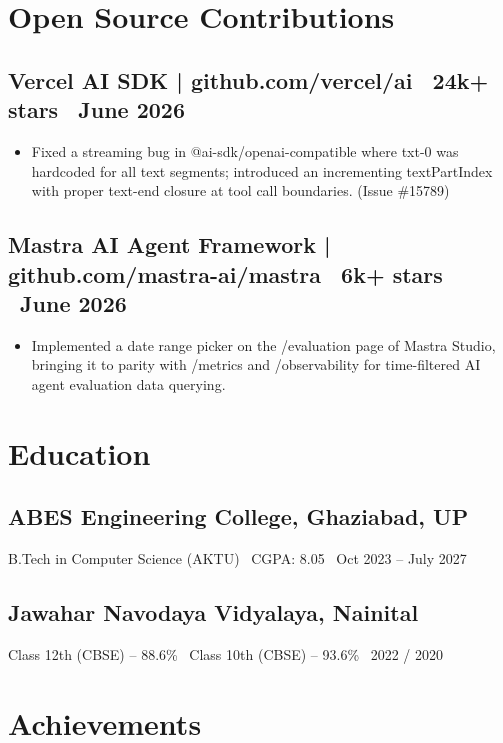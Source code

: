 \documentclass[11pt, a4paper]{article}
\begin{document}
\section*{Open Source Contributions}

\subsection*{Vercel AI SDK | github.com/vercel/ai \textbar\ 24k+ stars \textbar\ June 2026}
\begin{itemize}
\item Fixed a streaming bug in @ai-sdk/openai-compatible where txt-0 was hardcoded for all text segments; introduced an incrementing textPartIndex with proper text-end closure at tool call boundaries. (Issue \#15789)
\end{itemize}

\subsection*{Mastra AI Agent Framework | github.com/mastra-ai/mastra \textbar\ 6k+ stars \textbar\ June 2026}
\begin{itemize}
\item Implemented a date range picker on the /evaluation page of Mastra Studio, bringing it to parity with /metrics and /observability for time-filtered AI agent evaluation data querying.
\end{itemize}

\section*{Education}

\subsection*{ABES Engineering College, Ghaziabad, UP}
B.Tech in Computer Science (AKTU) \textbar\ CGPA: 8.05 \textbar\ Oct 2023 -- July 2027

\subsection*{Jawahar Navodaya Vidyalaya, Nainital}
Class 12th (CBSE) -- 88.6\% \textbar\ Class 10th (CBSE) -- 93.6\% \textbar\ 2022 / 2020

\section*{Achievements}
\end{document}
